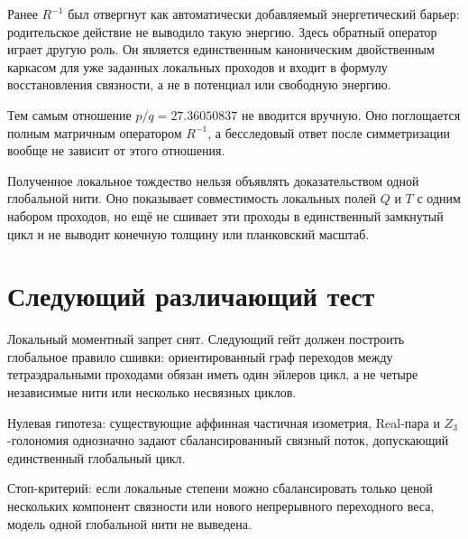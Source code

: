 Ранее $R^{-1}$ был отвергнут как автоматически добавляемый энергетический
барьер: родительское действие не выводило такую энергию. Здесь обратный
оператор играет другую роль. Он является единственным каноническим
двойственным каркасом для уже заданных локальных проходов и входит в
формулу восстановления связности, а не в потенциал или свободную энергию.

Тем самым отношение $p/q=27.36050837$ не вводится вручную. Оно поглощается
полным матричным оператором $R^{-1}$, а бесследовый ответ после
симметризации вообще не зависит от этого отношения.

\begin{nogocriterion}
Полученное локальное тождество нельзя объявлять доказательством одной
глобальной нити. Оно показывает совместимость локальных полей $Q$ и $T$ с
одним набором проходов, но ещё не сшивает эти проходы в единственный
замкнутый цикл и не выводит конечную толщину или планковский масштаб.
\end{nogocriterion}

\section{Следующий различающий тест}

Локальный моментный запрет снят. Следующий гейт должен построить глобальное
правило сшивки: ориентированный граф переходов между тетраэдральными
проходами обязан иметь один эйлеров цикл, а не четыре независимые нити или
несколько несвязных циклов.

Нулевая гипотеза: существующие аффинная частичная изометрия, Real-пара и
$Z_3$-голономия однозначно задают сбалансированный связный поток, допускающий
единственный глобальный цикл.

Стоп-критерий: если локальные степени можно сбалансировать только ценой
нескольких компонент связности или нового непрерывного переходного веса,
модель одной глобальной нити не выведена.

